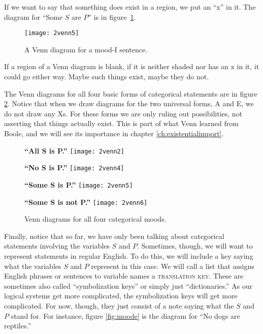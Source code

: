 If we want to say that something does exist in a region, we put an ``x'' in it. The diagram for ``Some $S$ are $P$'' is in figure~\ref{fig:moodi}.

\begin{figure}[!ht]\centering
\texttt{[image: 2venn5]}
\caption{A Venn diagram for a mood-I sentence.}
\label{fig:moodi}
\end{figure}


If a region of a Venn diagram is blank, if it is neither shaded nor has an x in it, it could go either way. Maybe such things exist, maybe they do not.

The Venn diagrams for all four basic forms of categorical statements are in figure \ref{fig:fourvenns}. Notice that when we draw diagrams for the two universal forms, A and E, we do not draw any Xs. For these forms we are only ruling out possibilities, not asserting that things actually exist. This is part of what Venn learned from Boole, and we will see its importance in chapter \ref{ch:existentialimport}.

\begin{figure}[!ht]
\begin{minipage}[t]{0.4\textwidth}\centering
    \textbf{``All S is P.''}
\texttt{[image: 2venn2]}
\end{minipage}\hspace{1cm}
\begin{minipage}[t]{0.4\textwidth}\centering
    \textbf{``No S is P.''}
\texttt{[image: 2venn4]}
\end{minipage}

\vspace{1cm}

\begin{minipage}[t]{0.4\textwidth}\centering
    \textbf{``Some S is P.''}
\texttt{[image: 2venn5]}
\end{minipage}\hspace{1cm}
\begin{minipage}[t]{0.4\textwidth}\centering
    \textbf{``Some S is not P.''}
\texttt{[image: 2venn6]}
\end{minipage}

\vspace{1cm}

\caption{Venn diagrams for all four categorical moods.}
\label{fig:fourvenns}
\end{figure}


Finally, notice that so far, we have only been talking about categorical statements involving the variables $S$ and $P$. Sometimes, though, we will want to represent statements in regular English. To do this, we will include a key saying what the variables $S$ and $P$ represent in this case. We will call a list that assigns English phrases or sentences to variable names a \textsc{\gls{translation key}}.\label{def:translation_key} These are sometimes also called ``symbolization keys'' or simply just ``dictionaries.'' As our logical systems get more complicated, the symbolization keys will get more complicated. For now, though, they just consist of a note saying what the $S$ and $P$ stand for. For instance, figure \ref{fig:moode} is the diagram for ``No dogs are reptiles.''

